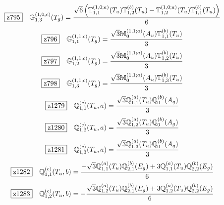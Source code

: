 \documentclass[fleqn,10pt,landscape]{jsarticle}
\begin{document}
\begin{dmath*}
\hspace*{3mm}\fbox{z795}\quad \mathbb{G}_{1,3}^{(1,0;c)}(T_{g})=\frac{\sqrt{6} \left(\mathbb{T}_{1,1}^{(1,0;a)}(T_{u}) \mathbb{T}_{1,2}^{(b)}(T_{u}) - \mathbb{T}_{1,2}^{(1,0;a)}(T_{u}) \mathbb{T}_{1,1}^{(b)}(T_{u})\right)}{6}
\end{dmath*}
\begin{dmath*}
\hspace*{3mm}\fbox{z796}\quad \mathbb{G}_{1,1}^{(1,1;c)}(T_{g})=\frac{\sqrt{3} \mathbb{M}_{0}^{(1,1;a)}(A_{u}) \mathbb{T}_{1,1}^{(b)}(T_{u})}{3}
\end{dmath*}
\begin{dmath*}
\hspace*{3mm}\fbox{z797}\quad \mathbb{G}_{1,2}^{(1,1;c)}(T_{g})=\frac{\sqrt{3} \mathbb{M}_{0}^{(1,1;a)}(A_{u}) \mathbb{T}_{1,2}^{(b)}(T_{u})}{3}
\end{dmath*}
\begin{dmath*}
\hspace*{3mm}\fbox{z798}\quad \mathbb{G}_{1,3}^{(1,1;c)}(T_{g})=\frac{\sqrt{3} \mathbb{M}_{0}^{(1,1;a)}(A_{u}) \mathbb{T}_{1,3}^{(b)}(T_{u})}{3}
\end{dmath*}
\begin{dmath*}
\hspace*{3mm}\fbox{z1279}\quad \mathbb{Q}_{1,1}^{(c)}(T_{u},a)=\frac{\sqrt{3} \mathbb{Q}_{1,1}^{(a)}(T_{u}) \mathbb{Q}_{0}^{(b)}(A_{g})}{3}
\end{dmath*}
\begin{dmath*}
\hspace*{3mm}\fbox{z1280}\quad \mathbb{Q}_{1,2}^{(c)}(T_{u},a)=\frac{\sqrt{3} \mathbb{Q}_{1,2}^{(a)}(T_{u}) \mathbb{Q}_{0}^{(b)}(A_{g})}{3}
\end{dmath*}
\begin{dmath*}
\hspace*{3mm}\fbox{z1281}\quad \mathbb{Q}_{1,3}^{(c)}(T_{u},a)=\frac{\sqrt{3} \mathbb{Q}_{1,3}^{(a)}(T_{u}) \mathbb{Q}_{0}^{(b)}(A_{g})}{3}
\end{dmath*}
\begin{dmath*}
\hspace*{3mm}\fbox{z1282}\quad \mathbb{Q}_{1,1}^{(c)}(T_{u},b)=\frac{- \sqrt{3} \mathbb{Q}_{1,1}^{(a)}(T_{u}) \mathbb{Q}_{2,1}^{(b)}(E_{g}) + 3 \mathbb{Q}_{1,1}^{(a)}(T_{u}) \mathbb{Q}_{2,2}^{(b)}(E_{g})}{6}
\end{dmath*}
\begin{dmath*}
\hspace*{3mm}\fbox{z1283}\quad \mathbb{Q}_{1,2}^{(c)}(T_{u},b)=- \frac{\sqrt{3} \mathbb{Q}_{1,2}^{(a)}(T_{u}) \mathbb{Q}_{2,1}^{(b)}(E_{g}) + 3 \mathbb{Q}_{1,2}^{(a)}(T_{u}) \mathbb{Q}_{2,2}^{(b)}(E_{g})}{6}
\end{dmath*}
\end{document}
